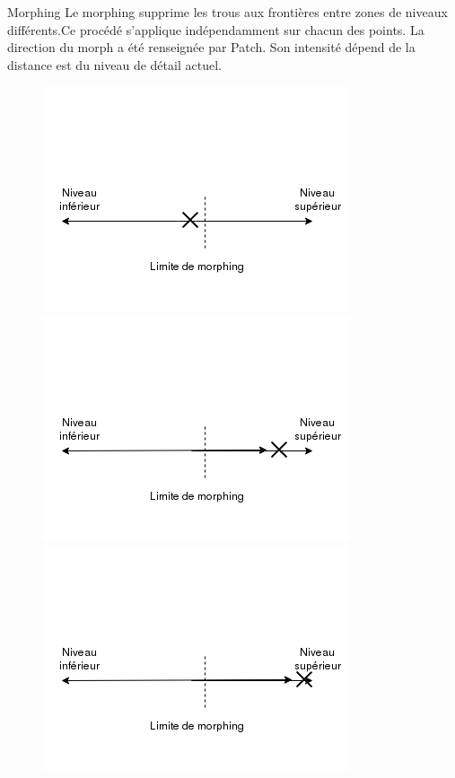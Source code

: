 \begin{frame}{Morphing}{}
 Le morphing supprime les trous aux frontières entre zones de niveaux différents.Ce procédé s'applique indépendamment sur chacun des points. La direction du morph a été renseignée par Patch. Son intensité dépend de la distance est du niveau de détail actuel.
 \begin{figure}[!b]
\centerline{
   \includegraphics[scale=0.35]{img/morphing1.png}
   \includegraphics[scale=0.35]{img/morphing2.png}
   \includegraphics[scale=0.35]{img/morphing3.png}
   }
   \centerline{
}
\end{figure}
\end{frame}
